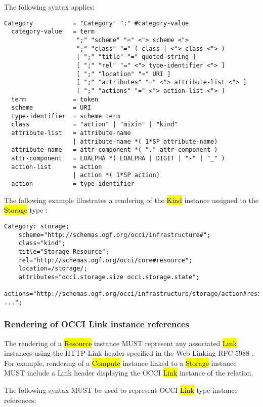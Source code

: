 \documentclass[10pt,a4paper]{article}
\begin{document}
The following syntax applies:

\begin{verbatim}
Category           = "Category" ":" #category-value
  category-value   = term
                    ";" "scheme" "=" <"> scheme <">
                    ";" "class" "=" ( class | <"> class <"> )
                    [ ";" "title" "=" quoted-string ]
                    [ ";" "rel" "=" <"> type-identifier <"> ]
                    [ ";" "location" "=" URI ]
                    [ ";" "attributes" "=" <"> attribute-list <"> ]
                    [ ";" "actions" "=" <"> action-list <"> ]
  term             = token
  scheme           = URI
  type-identifier  = scheme term
  class            = "action" | "mixin" | "kind"
  attribute-list   = attribute-name
                   | attribute-name *( 1*SP attribute-name)
  attribute-name   = attr-component *( "." attr-component )
  attr-component   = LOALPHA *( LOALPHA | DIGIT | "-" | "_" )
  action-list      = action
                   | action *( 1*SP action)
  action           = type-identifier
\end{verbatim}

The following example illustrates a rendering of the \hl{Kind}
instance assigned to the \hl{Storage} type \cite{occi:infrastructure}:

\begin{verbatim}
Category: storage;
    scheme="http://schemas.ogf.org/occi/infrastructure#";
    class="kind";
    title="Storage Resource";
    rel="http://schemas.ogf.org/occi/core#resource";
    location=/storage/;
    attributes="occi.storage.size occi.storage.state";
    actions="http://schemas.ogf.org/occi/infrastructure/storage/action#resize ...";
\end{verbatim}

\subsubsection{Rendering of OCCI Link instance references}
The rendering of a \hl{Resource} instance \cite{occi:core} MUST
represent any associated \hl{Link} instances using the HTTP Link
header specified in the Web Linking RFC 5988 \cite{rfc5988}.  For
example, rendering of a \hl{Compute} instance linked to a \hl{Storage}
instance MUST include a Link header displaying the OCCI \hl{Link}
instance of the relation.

The following syntax MUST be used to represent OCCI \hl{Link} type
instance references:
\end{document}
